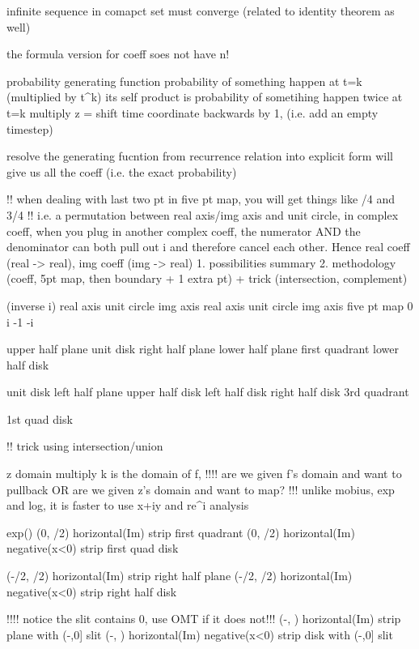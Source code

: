 infinite sequence in comapct set must converge (related to identity theorem as well)

the formula version for coeff soes not have n!

probability generating function
	probability of something happen at t=k (multiplied by t^k)
	its self product is probability of sometihing happen twice at t=k
	multiply z = shift time coordinate backwards by 1, (i.e. add an empty timestep)
	
	resolve the generating fucntion from recurrence relation into explicit form will give us all the coeff (i.e. the exact probability)


!! when dealing with last two pt in five pt map, you will get things like \pi/4 and 3\pi/4
!! i.e. a permutation between real axis/img axis and unit circle, in complex coeff, when you plug in another complex coeff, the numerator AND the denominator can both pull out i and therefore cancel each other. Hence real coeff (real -> real), img coeff (img -> real)
1. possibilities summary 
2. methodology (coeff, 5pt map, then boundary + 1 extra pt) + trick (intersection, complement)


						 (inverse i)
real axis				unit circle
img	axis				real axis
unit circle				img axis
five pt map
	 0
i	-1	  -i			
   \infty

upper half plane		unit disk
right half plane		lower half plane
first quadrant			lower half disk

unit disk				left half plane	
upper half disk			left half disk
right half disk			3rd quadrant
					
1st quad disk

!! trick using intersection/union

z domain multiply k is the domain of f,
!!!! are we given f's domain and want to pullback OR are we given z's domain and want to map?
!!! unlike mobius, exp and log, it is faster to use x+iy and re^{i\theta} analysis

															exp()
(0, \pi/2) horizontal(Im) strip							first quadrant
(0, \pi/2) horizontal(Im) negative(x<0) strip 			first quad disk	
	
(-\pi/2, \pi/2) horizontal(Im) strip					right half plane
(-\pi/2, \pi/2) horizontal(Im) negative(x<0) strip		right half disk

!!!! notice the slit contains 0, use OMT if it does not!!!
(-\pi, \pi) horizontal(Im) strip						plane with (-\infty,0] slit
(-\pi, \pi) horizontal(Im) negative(x<0) strip			disk with (-\infty,0] slit

